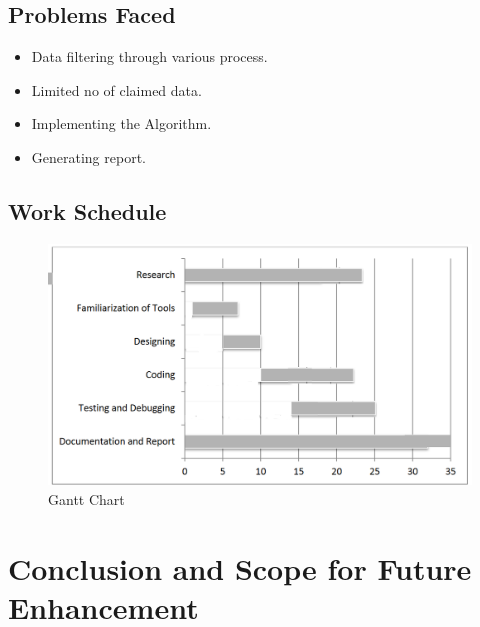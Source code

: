  
\section{Problems Faced}
\begin{itemize}
\item Data filtering through various process. 
\item Limited no of claimed data.
\item Implementing the Algorithm.
\item Generating report.
\end{itemize}

\section{Work Schedule}
\begin{figure}[tbh] %
\begin{center}
	\includegraphics[width=5in]{images/gantt.png}
	\caption{Gantt Chart} %
	\label{Gantt chart} %
\end{center}
\end{figure}



\chapter{Conclusion and Scope for Future Enhancement}
